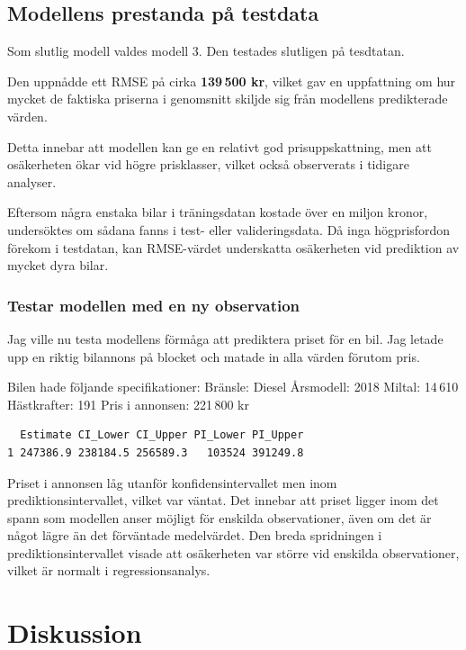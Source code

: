 \documentclass[
  letterpaper,
  DIV=11,
  numbers=noendperiod]{scrreprt}
\begin{document}
\subsection{Modellens prestanda på
testdata}\label{modellens-prestanda-puxe5-testdata}

Som slutlig modell valdes modell 3. Den testades slutligen på tesdtatan.

Den uppnådde ett RMSE på cirka \textbf{139\,500 kr}, vilket gav en
uppfattning om hur mycket de faktiska priserna i genomsnitt skiljde sig
från modellens predikterade värden.

Detta innebar att modellen kan ge en relativt god prisuppskattning, men
att osäkerheten ökar vid högre prisklasser, vilket också observerats i
tidigare analyser.

Eftersom några enstaka bilar i träningsdatan kostade över en miljon
kronor, undersöktes om sådana fanns i test- eller valideringsdata. Då
inga högprisfordon förekom i testdatan, kan RMSE-värdet underskatta
osäkerheten vid prediktion av mycket dyra bilar.

\subsubsection{Testar modellen med en ny
observation}\label{testar-modellen-med-en-ny-observation}

Jag ville nu testa modellens förmåga att prediktera priset för en bil.
Jag letade upp en riktig bilannons på blocket och matade in alla värden
förutom pris.

Bilen hade följande specifikationer: Bränsle: Diesel Årsmodell: 2018
Miltal: 14\,610 Hästkrafter: 191 Pris i annonsen: 221\,800 kr

\begin{verbatim}
  Estimate CI_Lower CI_Upper PI_Lower PI_Upper
1 247386.9 238184.5 256589.3   103524 391249.8
\end{verbatim}

Priset i annonsen låg utanför konfidensintervallet men inom
prediktionsintervallet, vilket var väntat. Det innebar att priset ligger
inom det spann som modellen anser möjligt för enskilda observationer,
även om det är något lägre än det förväntade medelvärdet. Den breda
spridningen i prediktionsintervallet visade att osäkerheten var större
vid enskilda observationer, vilket är normalt i regressionsanalys.

\section{Diskussion}\label{diskussion}
\end{document}
